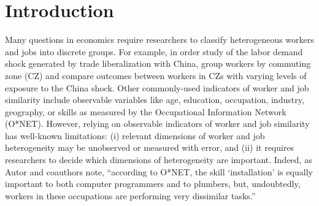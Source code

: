 \documentclass[12pt]{article}
\theoremstyle{definition}
\theoremstyle{plain}
\begin{document}


\clearpage

\onehalfspacing
\section{Introduction}

Many questions in economics require researchers to classify heterogeneous workers and jobs into discrete groups. For example, in order study of the labor demand shock generated by trade liberalization with China, \citet{AutorDornHanson2013} group workers by commuting zone (CZ) and compare outcomes between workers in CZs with varying levels of exposure to the China shock. Other commonly-used indicators of worker and job similarity include observable variables like age, education, occupation, industry, geography, or skills as measured by the Occupational Information Network (O*NET). However, relying on observable indicators of worker and job similarity has well-known limitations: (i) relevant dimensions of worker and job heterogeneity may be unobserved or measured with error, and (ii) it requires researchers to decide which dimensions of heterogeneity are important. Indeed, as Autor and coauthors note, ``according to O*NET, the skill `installation' is equally important to both computer programmers and to plumbers, but, undoubtedly, workers in these occupations are performing very dissimilar tasks.''  \citep{FrankAutorBessenBrynjolfssonCebrianDemingFeldmanGrohLoboMoro2019}
\end{document}
